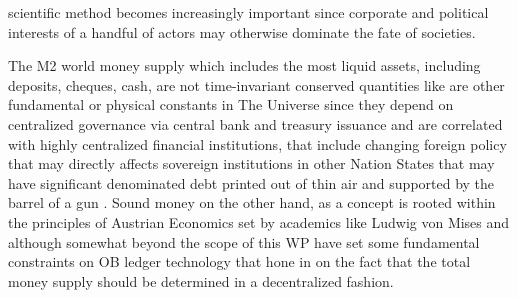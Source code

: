 \documentclass[final,5p,times,twocolumn,authoryear]{elsarticle}
\begin{document}
scientific method becomes increasingly important since corporate and political interests of a handful of actors may otherwise dominate the fate of societies.  

The M2 world money supply which includes the most liquid assets, including deposits, cheques, cash, are not time-invariant conserved quantities like are other fundamental or physical constants in The Universe since they depend on centralized governance via central bank and treasury issuance and are correlated with highly centralized financial institutions, that include changing foreign policy that may directly affects sovereign institutions in other Nation States that may have significant denominated debt printed out of thin air and supported by the barrel of a gun \cite{chomsky2002understanding}. Sound money on the other hand, as a concept is rooted within the principles of Austrian Economics set by academics like Ludwig von Mises  \cite{Hansen2020Book} and although somewhat beyond the scope of this WP have set some fundamental constraints on OB ledger technology that hone in on the fact that the total money supply should be determined in a decentralized fashion.  
\end{document}
